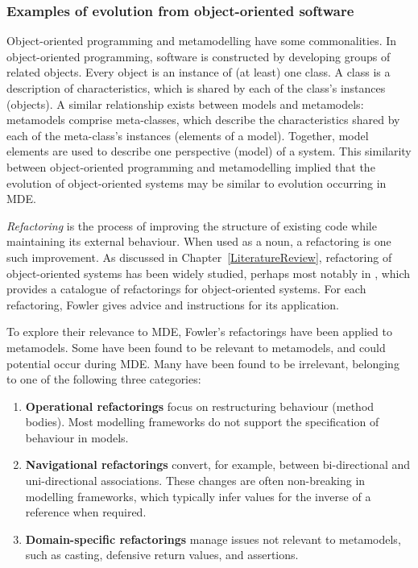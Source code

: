 \subsubsection{Examples of evolution from object-oriented software}
Object-oriented programming and metamodelling have some commonalities. In object-oriented programming, software is constructed by developing groups of related objects. Every object is an instance of (at least) one class. A class is a description of characteristics, which is shared by each of the class's instances (objects). A similar relationship exists between models and metamodels: metamodels comprise meta-classes, which describe the characteristics shared by each of the meta-class's instances (elements of a model). Together, model elements are used to describe one perspective (model) of a system. This similarity between object-oriented programming and metamodelling implied that the evolution of object-oriented systems may be similar to evolution occurring in MDE. 

\emph{Refactoring} is the process of improving the structure of existing code while maintaining its external behaviour. When used as a noun, a refactoring is one such improvement. As discussed in Chapter~\ref{LiteratureReview}, refactoring of object-oriented systems has been widely studied, perhaps most notably in \cite{fowler99refactoring}, which provides a catalogue of refactorings for object-oriented systems. For each refactoring, Fowler gives advice and instructions for its application.

To explore their relevance to MDE, Fowler's refactorings have been applied to metamodels. Some have been found to be relevant to metamodels, and could potential occur during MDE. Many have been found to be irrelevant, belonging to one of the following three categories:

\begin{enumerate}
	\item \textbf{Operational refactorings} focus on restructuring behaviour (method bodies). Most modelling frameworks do not support the specification of behaviour in models.
	\item \textbf{Navigational refactorings} convert, for example, between bi-directional and uni-directional associations. These changes are often non-breaking in modelling frameworks, which typically infer values for the inverse of a reference when required.
	\item \textbf{Domain-specific refactorings} manage issues not relevant to metamodels, such as casting, defensive return values, and assertions.
\end{enumerate}

